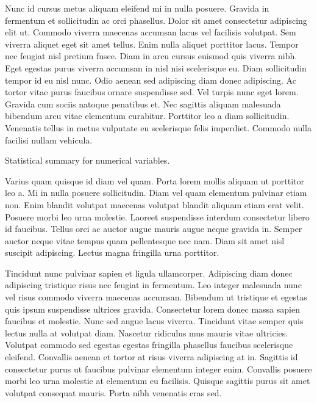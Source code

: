 Nunc id cursus metus aliquam eleifend mi in nulla posuere. Gravida in fermentum et sollicitudin ac orci phasellus. Dolor sit amet consectetur adipiscing elit ut. Commodo viverra maecenas accumsan lacus vel facilisis volutpat. Sem viverra aliquet eget sit amet tellus. Enim nulla aliquet porttitor lacus. Tempor nec feugiat nisl pretium fusce. Diam in arcu cursus euismod quis viverra nibh. Eget egestas purus viverra accumsan in nisl nisi scelerisque eu. Diam sollicitudin tempor id eu nisl nunc. Odio aenean sed adipiscing diam donec adipiscing. Ac tortor vitae purus faucibus ornare suspendisse sed. Vel turpis nunc eget lorem. Gravida cum sociis natoque penatibus et. Nec sagittis aliquam malesuada bibendum arcu vitae elementum curabitur. Porttitor leo a diam sollicitudin. Venenatis tellus in metus vulputate eu scelerisque felis imperdiet. Commodo nulla facilisi nullam vehicula.

\begin{center}

	\begin{table}[!t]
	\caption{Statistical summary for numerical variables.
	{\label{tab:stats_num_data}}}
	
	\end{table}
\end{center}

Varius quam quisque id diam vel quam. Porta lorem mollis aliquam ut porttitor leo a. Mi in nulla posuere sollicitudin. Diam vel quam elementum pulvinar etiam non. Enim blandit volutpat maecenas volutpat blandit aliquam etiam erat velit. Posuere morbi leo urna molestie. Laoreet suspendisse interdum consectetur libero id faucibus. Tellus orci ac auctor augue mauris augue neque gravida in. Semper auctor neque vitae tempus quam pellentesque nec nam. Diam sit amet nisl suscipit adipiscing. Lectus magna fringilla urna porttitor.

Tincidunt nunc pulvinar sapien et ligula ullamcorper. Adipiscing diam donec adipiscing tristique risus nec feugiat in fermentum. Leo integer malesuada nunc vel risus commodo viverra maecenas accumsan. Bibendum ut tristique et egestas quis ipsum suspendisse ultrices gravida. Consectetur lorem donec massa sapien faucibus et molestie. Nunc sed augue lacus viverra. Tincidunt vitae semper quis lectus nulla at volutpat diam. Nascetur ridiculus mus mauris vitae ultricies. Volutpat commodo sed egestas egestas fringilla phasellus faucibus scelerisque eleifend. Convallis aenean et tortor at risus viverra adipiscing at in. Sagittis id consectetur purus ut faucibus pulvinar elementum integer enim. Convallis posuere morbi leo urna molestie at elementum eu facilisis. Quisque sagittis purus sit amet volutpat consequat mauris. Porta nibh venenatis cras sed.


